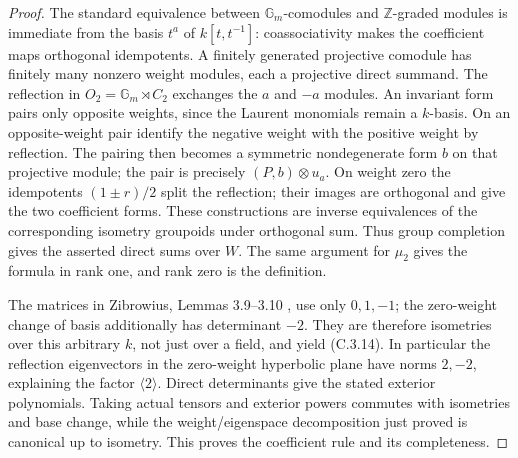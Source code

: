 \begin{proof}
The standard equivalence between $\mathbb G_m$-comodules and
$\mathbb Z$-graded modules is immediate from the basis $t^a$ of
$k[t,t^{-1}]$: coassociativity makes the coefficient maps orthogonal
idempotents. A finitely generated projective comodule has finitely many
nonzero weight modules, each a projective direct summand. The reflection
in $O_2=\mathbb G_m\rtimes C_2$ exchanges the $a$ and $-a$ modules.
An invariant form pairs only opposite weights, since the Laurent
monomials remain a $k$-basis. On an opposite-weight pair identify the
negative weight with the positive weight by reflection. The pairing
then becomes a symmetric nondegenerate form $b$ on that projective
module; the pair is precisely $(P,b)\otimes u_a$.
On weight zero the idempotents $(1\pm r)/2$ split the reflection;
their images are orthogonal and give the two coefficient forms.
These constructions are inverse equivalences of the corresponding
isometry groupoids under orthogonal sum. Thus group completion gives
the asserted direct sums over $W$. The same argument for $\mu_2$
gives the formula in rank one, and rank zero is the definition.

The matrices in Zibrowius, Lemmas 3.9--3.10
\cite{C-Zibrowius2015}, use only $0,1,-1$; the zero-weight change of
basis additionally has determinant $-2$. They are therefore isometries
over this arbitrary $k$, not just over a field, and yield (C.3.14).
In particular the reflection eigenvectors in the zero-weight
hyperbolic plane have norms $2,-2$, explaining the factor
$\langle2\rangle$. Direct determinants give the stated exterior
polynomials. Taking actual tensors and exterior powers commutes with
isometries and base change, while the weight/eigenspace decomposition
just proved is canonical up to isometry. This proves the coefficient
rule and its completeness.
\end{proof}

